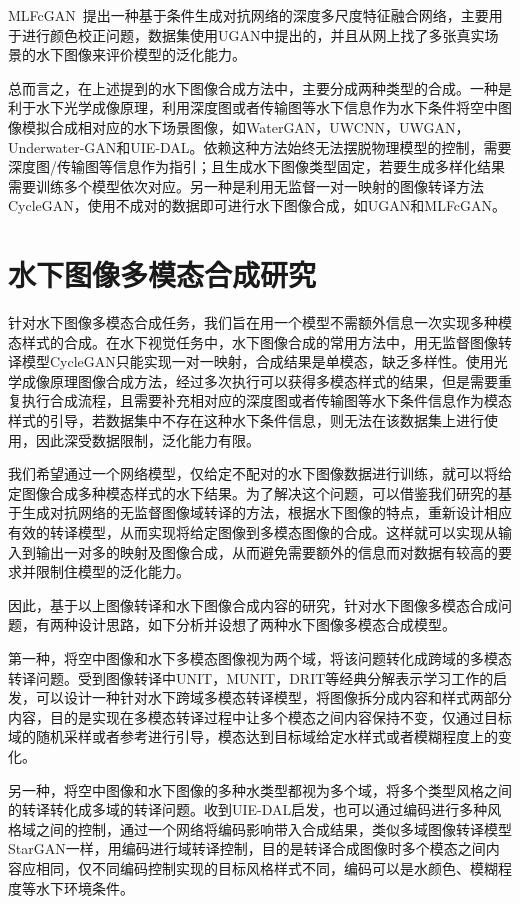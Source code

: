 MLFcGAN~\cite{liu2019mlfcgan}提出一种基于条件生成对抗网络的深度多尺度特征融合网络，主要用于进行颜色校正问题，数据集使用UGAN中提出的，并且从网上找了多张真实场景的水下图像来评价模型的泛化能力。

总而言之，在上述提到的水下图像合成方法中，主要分成两种类型的合成。一种是利于水下光学成像原理，利用深度图或者传输图等水下信息作为水下条件将空中图像模拟合成相对应的水下场景图像，如WaterGAN，UWCNN，UWGAN，Underwater-GAN和UIE-DAL。依赖这种方法始终无法摆脱物理模型的控制，需要深度图/传输图等信息作为指引；且生成水下图像类型固定，若要生成多样化结果需要训练多个模型依次对应。另一种是利用无监督一对一映射的图像转译方法CycleGAN，使用不成对的数据即可进行水下图像合成，如UGAN和MLFcGAN。

\section{水下图像多模态合成研究}
针对水下图像多模态合成任务，我们旨在用一个模型不需额外信息一次实现多种模态样式的合成。在水下视觉任务中，水下图像合成的常用方法中，用无监督图像转译模型CycleGAN只能实现一对一映射，合成结果是单模态，缺乏多样性。使用光学成像原理图像合成方法，经过多次执行可以获得多模态样式的结果，但是需要重复执行合成流程，且需要补充相对应的深度图或者传输图等水下条件信息作为模态样式的引导，若数据集中不存在这种水下条件信息，则无法在该数据集上进行使用，因此深受数据限制，泛化能力有限。

我们希望通过一个网络模型，仅给定不配对的水下图像数据进行训练，就可以将给定图像合成多种模态样式的水下结果。为了解决这个问题，可以借鉴我们研究的基于生成对抗网络的无监督图像域转译的方法，根据水下图像的特点，重新设计相应有效的转译模型，从而实现将给定图像到多模态图像的合成。这样就可以实现从输入到输出一对多的映射及图像合成，从而避免需要额外的信息而对数据有较高的要求并限制住模型的泛化能力。

因此，基于以上图像转译和水下图像合成内容的研究，针对水下图像多模态合成问题，有两种设计思路，如下分析并设想了两种水下图像多模态合成模型。

第一种，将空中图像和水下多模态图像视为两个域，将该问题转化成跨域的多模态转译问题。受到图像转译中UNIT，MUNIT，DRIT等经典分解表示学习工作的启发，可以设计一种针对水下跨域多模态转译模型，将图像拆分成内容和样式两部分内容，目的是实现在多模态转译过程中让多个模态之间内容保持不变，仅通过目标域的随机采样或者参考进行引导，模态达到目标域给定水样式或者模糊程度上的变化。

另一种，将空中图像和水下图像的多种水类型都视为多个域，将多个类型风格之间的转译转化成多域的转译问题。收到UIE-DAL启发，也可以通过编码进行多种风格域之间的控制，通过一个网络将编码影响带入合成结果，类似多域图像转译模型StarGAN一样，用编码进行域转译控制，目的是转译合成图像时多个模态之间内容应相同，仅不同编码控制实现的目标风格样式不同，编码可以是水颜色、模糊程度等水下环境条件。


